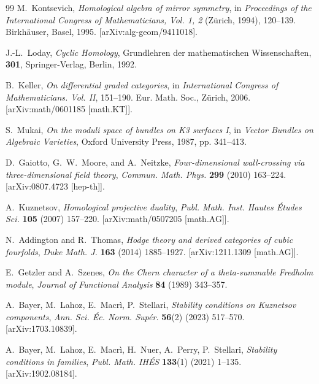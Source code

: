 \documentclass[12pt,reqno]{amsart}
\theoremstyle{remark} \newtheorem{remark}[theorem]{Remark}
\begin{document}
\begin{thebibliography}{99}
 M.~Kontsevich, \emph{Homological algebra of
mirror symmetry}, in \emph{Proceedings of the International Congress
of Mathematicians, Vol. 1, 2} (Z\"{u}rich, 1994),
  120--139. Birkh\"{a}user, Basel, 1995.  [arXiv:alg-geom/9411018].

 J.-L.~Loday, \emph{Cyclic Homology}, Grundlehren
  der mathematischen Wissenschaften, \textbf{301}, Springer-Verlag,
  Berlin, 1992.

 B.~Keller, \emph{On differential graded
categories}, in \emph{International Congress of
Mathematicians. Vol. II}, 151--190. Eur. Math. Soc., Z\"{u}rich, 2006.
  [arXiv:math/0601185 [math.KT]].

 S.~Mukai, \emph{On the moduli space of bundles on
K3 surfaces I}, in \emph{Vector Bundles on Algebraic Varieties},
  Oxford University Press, 1987, pp. 341--413.

 D.~Gaiotto, G.~W.~Moore, and A.~Neitzke,
  \emph{Four-dimensional wall-crossing via three-dimensional field
  theory}, \emph{Commun. Math. Phys.} \textbf{299} (2010) 163--224.
       [arXiv:0807.4723 [hep-th]].

 A.~Kuznetsov, \emph{Homological projective
duality}, \emph{Publ. Math. Inst. Hautes \'{E}tudes Sci.} \textbf{105}
  (2007) 157--220.  [arXiv:math/0507205 [math.AG]].

 N.~Addington and R.~Thomas, \emph{Hodge theory
and derived categories of cubic fourfolds}, \emph{Duke Math. J.}
  \textbf{163} (2014) 1885--1927.  [arXiv:1211.1309 [math.AG]].

 E.~Getzler and A.~Szenes, \emph{On the
Chern character of a theta-summable Fredholm module}, \emph{Journal of
Functional Analysis} \textbf{84} (1989) 343--357.


        A.~Bayer, M.~Lahoz, E.~Macr\`{i}, P.~Stellari,
         \emph{Stability conditions on Kuznetsov components},
         \emph{Ann. Sci. \'{E}c. Norm. Sup\'{e}r.} \textbf{56}(2) (2023)
         517--570. [arXiv:1703.10839].

        A.~Bayer, M.~Lahoz, E.~Macr\`{i}, H.~Nuer,
         A.~Perry, P.~Stellari, \emph{Stability conditions in
         families}, \emph{Publ. Math. IH\'{E}S} \textbf{133}(1) (2021)
         1--135. [arXiv:1902.08184].

\end{thebibliography}
\end{document}
